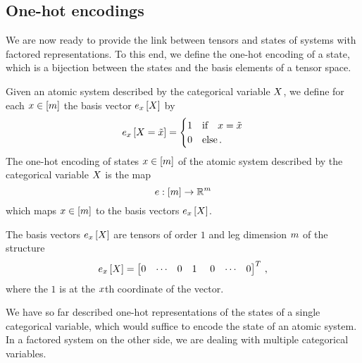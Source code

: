 \subsection{One-hot encodings}

We are now ready to provide the link between tensors and states of systems with factored representations.
To this end, we define the one-hot encoding of a state, which is a bijection between the states and the basis elements of a tensor space.

\begin{definition}
	Given an atomic system described by the categorical variable $X$, we define for each $x\in[m]$ the basis vector $e_{x}\left[X\right]$ by
	\begin{align}
		e_{x}\left[X=\tilde{x}\right] = \begin{cases}
			1 & \text{if} \quad x=\tilde{x} \\
			0 & \text{else} \, .
		\end{cases} 
	\end{align}
	The one-hot encoding of states $x\in[m]$ of the atomic system described by the categorical variable $X$ is the map
		\[ e: [m] \rightarrow \mathbb{R}^m \]
	which maps $x \in [m]$ to the basis vectors $e_{x}\left[X\right]$.
\end{definition}

The basis vectors $e_{x}\left[X\right]$ are tensors of order $1$ and leg dimension $m$ of the structure
\begin{align}
	\onehotmapofat{\catindex}{\catvariable} = \begin{bmatrix}
	0 & \cdots & 0 & 1 &  0 & \cdots & 0
	\end{bmatrix}^T \, ,
\end{align}
where the $1$ is at the $x$th coordinate of the vector.

We have so far described one-hot representations of the states of a single categorical variable, which would suffice to encode the state of an atomic system.
In a factored system on the other side, we are dealing with multiple categorical variables.

